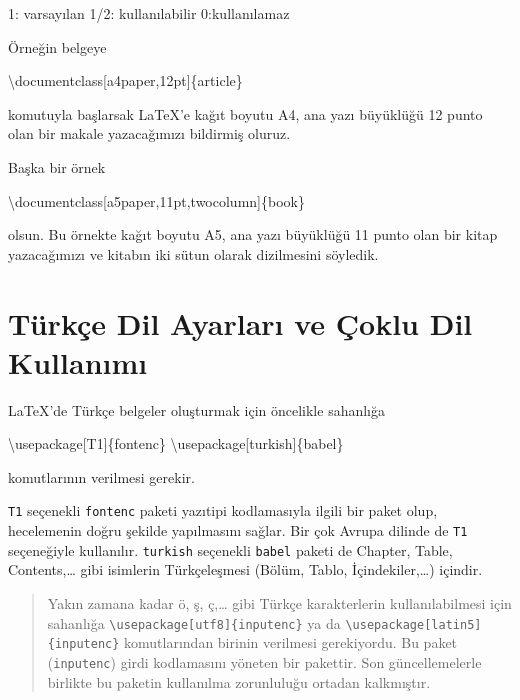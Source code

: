 \documentclass[
  10pt,
]{scrbook}
\newenvironment{Shaded}{\begin{snugshade}}{\end{snugshade}}
\newcommand{\NormalTok}[1]{#1}
\begin{document}
1: varsayılan 1/2: kullanılabilir 0:kullanılamaz

Örneğin belgeye

\begin{Shaded}
\begin{Highlighting}[]
\NormalTok{\textbackslash{}documentclass[a4paper,12pt]\{article\}}
\end{Highlighting}
\end{Shaded}

komutuyla başlarsak LaTeX'e kağıt boyutu A4, ana yazı büyüklüğü 12 punto
olan bir makale yazacağımızı bildirmiş oluruz.

Başka bir örnek

\begin{Shaded}
\begin{Highlighting}[]
\NormalTok{\textbackslash{}documentclass[a5paper,11pt,twocolumn]\{book\}}
\end{Highlighting}
\end{Shaded}

olsun. Bu örnekte kağıt boyutu A5, ana yazı büyüklüğü 11 punto olan bir
kitap yazacağımızı ve kitabın iki sütun olarak dizilmesini söyledik.

\hypertarget{tuxfcrkuxe7e-dil-ayarlarux131-ve-uxe7oklu-dil-kullanux131mux131}{%
\section{Türkçe Dil Ayarları ve Çoklu Dil Kullanımı}\label{tuxfcrkuxe7e-dil-ayarlarux131-ve-uxe7oklu-dil-kullanux131mux131}}

LaTeX'de Türkçe belgeler oluşturmak için öncelikle sahanlığa

\begin{Shaded}
\begin{Highlighting}[]
\NormalTok{\textbackslash{}usepackage[T1]\{fontenc\}}
\NormalTok{\textbackslash{}usepackage[turkish]\{babel\}}
\end{Highlighting}
\end{Shaded}

komutlarının verilmesi gerekir.

\texttt{T1} seçenekli \texttt{fontenc} paketi yazıtipi kodlamasıyla ilgili bir paket
olup, hecelemenin doğru şekilde yapılmasını sağlar. Bir çok Avrupa
dilinde de \texttt{T1} seçeneğiyle kullanılır. \texttt{turkish} seçenekli \texttt{babel}
paketi de Chapter, Table, Contents,\ldots{} gibi isimlerin Türkçeleşmesi
(Bölüm, Tablo, İçindekiler,\ldots) içindir.

\begin{quote}
Yakın zamana kadar ö, ş, ç,\ldots{} gibi Türkçe karakterlerin
kullanılabilmesi için sahanlığa \texttt{\textbackslash{}usepackage{[}utf8{]}\{inputenc\}} ya da
\texttt{\textbackslash{}usepackage{[}latin5{]}\{inputenc\}} komutlarından birinin verilmesi
gerekiyordu. Bu paket (\texttt{inputenc}) girdi kodlamasını yöneten bir
pakettir. Son güncellemelerle birlikte bu paketin kullanılma
zorunluluğu ortadan kalkmıştır.
\end{quote}
\end{document}
